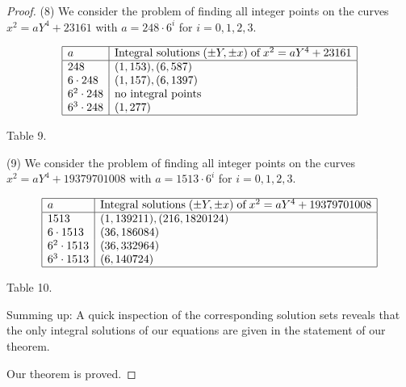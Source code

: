 \documentclass[10pt]{amsart}
\theoremstyle{plain}
\begin{document}
\begin{proof}
(8) We consider the problem of finding all integer points on the curves $x^2=aY^4+23161$ with $a=248\cdot 6^{i}$ for $i=0,1,2,3$.
\begin{center}
\begin{equation*}
\begin{array}{|l|l|}
  \hline
  
  a          & \mbox{Integral solutions}\;(\pm Y, \pm x)\;\mbox{of}\;x^2=aY^4+23161  \\
  \hline
  248          & (1, 153), (6, 587)\\
  6\cdot 248   & (1, 157), (6, 1397)\\
  6^2\cdot 248  & \mbox{no integral points} \\
  6^3\cdot 248  & (1,277)\\
   \hline
\end{array}
\end{equation*}
\end{center}
\begin{center}
Table 9.
\end{center}

(9) We consider the problem of finding all integer points on the curves $x^2=aY^4+19379701008$ with $a=1513\cdot 6^{i}$ for $i=0,1,2,3$.
\begin{center}
\begin{equation*}
\begin{array}{|l|l|}
  \hline
  
  a          & \mbox{Integral solutions}\;(\pm Y, \pm x)\;\mbox{of}\;x^2=aY^4+19379701008  \\
  \hline
  1513            & (1, 139211), (216, 1820124)\\
  6\cdot 1513     & (36, 186084)\\
  6^2\cdot 1513   & (36, 332964)\\
  6^{3}\cdot 1513 &(6, 140724)\\
   \hline
\end{array}
\end{equation*}
\end{center}
\begin{center}
Table 10.
\end{center}

\bigskip

Summing up: A quick inspection of the corresponding solution sets reveals that the only integral solutions of our equations are given in the statement of our theorem.

Our theorem is proved.
\end{proof}
\end{document}
